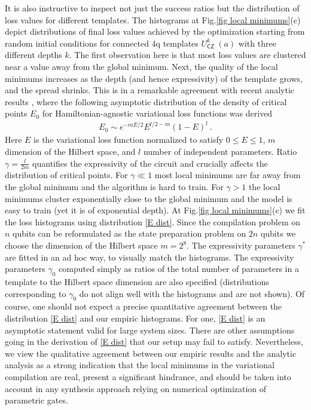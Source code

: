\documentclass[twocolumn, amsfonts, amssymb, aps, nofootinbib]{revtex4-2}
\newcommand{\CZ}{\textsf{CZ }}
\begin{document}
It is also instructive to inspect not just the success ratios but the distribution of loss values for different templates. The histograms at Fig.\ref{fig local minimums}(c) depict distributions of final loss values achieved by the optimization starting from random initial conditions for connected 4q templates $U_\CZ^k(a)$  with three different depths $k$. The first observation here is that most loss values are clustered near a value away from the global minimum. Next, the quality of the local minimums increases as the depth (and hence expressivity) of the template grows, and the spread shrinks. This is in a remarkable agreement with recent analytic results \cite{Anschuetz2021, Anschuetz2022}, where the following asymptotic distribution of the density of critical points $E_0$ for Hamiltonian-agnostic variational loss functions was derived
\begin{align}
E_0\sim e^{-m E/2} E^{l/2-m} (1-E)^l \ . \label{E dist}
\end{align}
Here $E$ is the variational loss function normalized to satisfy $0\le E\le1$, $m$ dimension of the Hilbert space, and $l$ number of independent parameters. Ratio $\gamma=\frac{l}{2m}$ quantifies the expressivity of the circuit and crucially affects the distribution of critical points. For $\gamma\ll 1$ most local minimums are far away from the global minimum and the algorithm is hard to train. For $\gamma>1$ the local minimums cluster exponentially close to the global minimum and the model is easy to train (yet it is of exponential depth). At Fig.\ref{fig local minimums}(c) we fit the loss histograms using distribution \eqref{E dist}. Since the compilation problem on $n$ qubits can be reformulated as the state preparation problem on $2n$ qubits we choose the dimension of the Hilbert space $m=2^8$. The expressivity parameters $\gamma^*$ are fitted in an ad hoc way, to visually match the histograms. The expressivity parameters $\gamma_0$ computed simply as ratios of the total number of parameters in a template to the Hilbert space dimension are also specified (distributions corresponding to $\gamma_0$ do not align well with the histograms and are not shown). Of course, one should not expect a precise quantitative agreement between the distribution \eqref{E dist} and our empiric histograms. For one, \eqref{E dist} is an asymptotic statement valid for large system sizes. There are other assumptions going in the derivation of \eqref{E dist} that our setup may fail to satisfy. Nevertheless, we view the qualitative agreement between our empiric results and the analytic analysis as a strong indication that the local minimums in the variational compilation are real, present a significant hindrance, and should be taken into account in any synthesis approach relying on numerical optimization of parametric gates.
\end{document}
